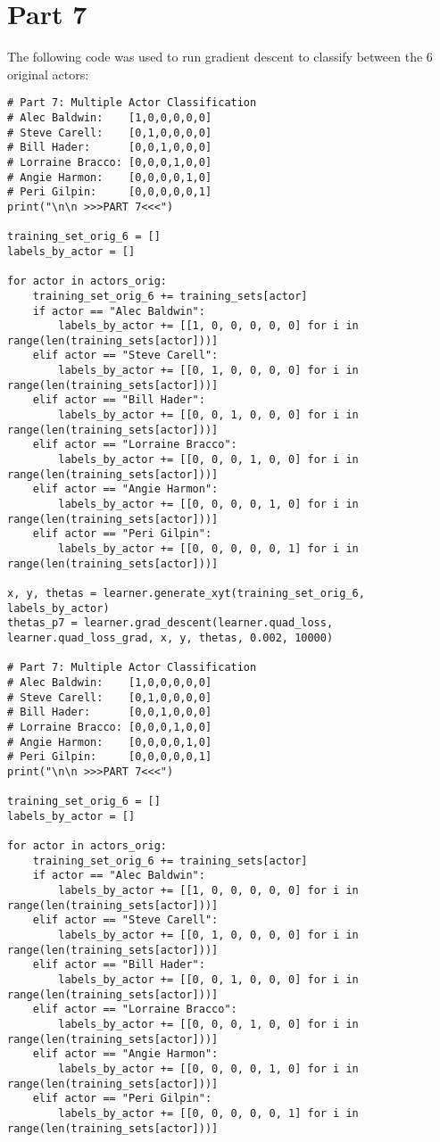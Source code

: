 \documentclass[11pt,a4paper]{report}
\begin{document}
\section*{Part 7}
The following code was used to run gradient descent to classify between the 6 original actors:
\begin{lstlisting}
# Part 7: Multiple Actor Classification
# Alec Baldwin:    [1,0,0,0,0,0]
# Steve Carell:    [0,1,0,0,0,0]
# Bill Hader:      [0,0,1,0,0,0]
# Lorraine Bracco: [0,0,0,1,0,0]
# Angie Harmon:    [0,0,0,0,1,0]
# Peri Gilpin:     [0,0,0,0,0,1]
print("\n\n >>>PART 7<<<")

training_set_orig_6 = []
labels_by_actor = []

for actor in actors_orig:
    training_set_orig_6 += training_sets[actor]
    if actor == "Alec Baldwin":
        labels_by_actor += [[1, 0, 0, 0, 0, 0] for i in range(len(training_sets[actor]))]
    elif actor == "Steve Carell":
        labels_by_actor += [[0, 1, 0, 0, 0, 0] for i in range(len(training_sets[actor]))]
    elif actor == "Bill Hader":
        labels_by_actor += [[0, 0, 1, 0, 0, 0] for i in range(len(training_sets[actor]))]
    elif actor == "Lorraine Bracco":
        labels_by_actor += [[0, 0, 0, 1, 0, 0] for i in range(len(training_sets[actor]))]
    elif actor == "Angie Harmon":
        labels_by_actor += [[0, 0, 0, 0, 1, 0] for i in range(len(training_sets[actor]))]
    elif actor == "Peri Gilpin":
        labels_by_actor += [[0, 0, 0, 0, 0, 1] for i in range(len(training_sets[actor]))]

x, y, thetas = learner.generate_xyt(training_set_orig_6, labels_by_actor)
thetas_p7 = learner.grad_descent(learner.quad_loss, learner.quad_loss_grad, x, y, thetas, 0.002, 10000)

# Part 7: Multiple Actor Classification
# Alec Baldwin:    [1,0,0,0,0,0]
# Steve Carell:    [0,1,0,0,0,0]
# Bill Hader:      [0,0,1,0,0,0]
# Lorraine Bracco: [0,0,0,1,0,0]
# Angie Harmon:    [0,0,0,0,1,0]
# Peri Gilpin:     [0,0,0,0,0,1]
print("\n\n >>>PART 7<<<")

training_set_orig_6 = []
labels_by_actor = []

for actor in actors_orig:
    training_set_orig_6 += training_sets[actor]
    if actor == "Alec Baldwin":
        labels_by_actor += [[1, 0, 0, 0, 0, 0] for i in range(len(training_sets[actor]))]
    elif actor == "Steve Carell":
        labels_by_actor += [[0, 1, 0, 0, 0, 0] for i in range(len(training_sets[actor]))]
    elif actor == "Bill Hader":
        labels_by_actor += [[0, 0, 1, 0, 0, 0] for i in range(len(training_sets[actor]))]
    elif actor == "Lorraine Bracco":
        labels_by_actor += [[0, 0, 0, 1, 0, 0] for i in range(len(training_sets[actor]))]
    elif actor == "Angie Harmon":
        labels_by_actor += [[0, 0, 0, 0, 1, 0] for i in range(len(training_sets[actor]))]
    elif actor == "Peri Gilpin":
        labels_by_actor += [[0, 0, 0, 0, 0, 1] for i in range(len(training_sets[actor]))]


\end{lstlisting}
\end{document}
